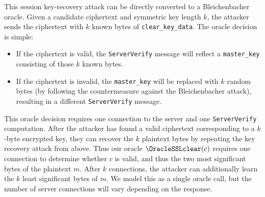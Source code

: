 

This session key-recovery attack can be directly converted to a Bleichenbacher oracle. Given a candidate ciphertext and symmetric key length $k$, the attacker sends the ciphertext with $k$ known bytes of \texttt{clear\_key\_data}. The oracle decision is simple:
\begin{itemize}
\item If the ciphertext is valid, the \texttt{ServerVerify} message will reflect a \texttt{master\_key} consisting of those $k$ known bytes.
\item If the ciphertext is invalid, the \texttt{master\_key} will be replaced with $k$ random bytes (by following the countermeasure against the Bleichenbacher attack), resulting in a different \texttt{ServerVerify} message.
\end{itemize}

This oracle decision requires one connection to the server and one \texttt{ServerVerify} computation. After the attacker has found a valid ciphertext corresponding to a $k$-byte encrypted key, they can recover the $k$ plaintext bytes by repeating the key recovery attack from above.  Thus our oracle $\OracleSSLclear(c)$ requires one connection to determine whether $c$ is valid, and thus the two most significant bytes  of the plaintext $m$.  After $k$ connections, the attacker can additionally learn the $k$ least significant bytes of $m$.  We model this as a single oracle call, but the number of server connections will vary depending on the response.
